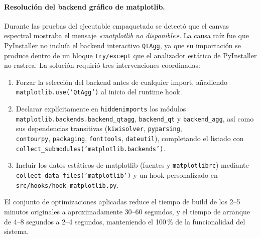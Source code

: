 \paragraph{Resolución del backend gráfico de matplotlib.}
Durante las pruebas del ejecutable empaquetado se detectó que el canvas
espectral mostraba el mensaje \textit{«matplotlib no disponible»}. La causa
raíz fue que PyInstaller no incluía el backend interactivo \texttt{QtAgg},
ya que su importación se produce dentro de un bloque \texttt{try/except} que
el analizador estático de PyInstaller no rastrea. La solución requirió tres
intervenciones coordinadas:

\begin{enumerate}
    \item Forzar la selección del backend antes de cualquier import,
    añadiendo\\ \texttt{matplotlib.use('QtAgg')} al inicio del runtime hook.
    \item Declarar explícitamente en \texttt{hiddenimports} los módulos \\
    \texttt{matplotlib.backends.backend\_qtagg}, \texttt{backend\_qt} y
    \texttt{backend\_agg}, así como sus dependencias transitivas
    (\texttt{kiwisolver}, \texttt{pyparsing},\\ \texttt{contourpy},
    \texttt{packaging}, \texttt{fonttools}, \texttt{dateutil}), completando
    el listado con \texttt{collect\_submodules('matplotlib.backends')}.
    \item Incluir los datos estáticos de matplotlib (fuentes y
    \texttt{matplotlibrc}) mediante \texttt{collect\_data\_files('matplotlib')}
    y un hook personalizado en \texttt{src/hooks/hook-matplotlib.py}.
\end{enumerate}

El conjunto de optimizaciones aplicadas reduce el tiempo de build de los
2--5 minutos originales a aproximadamente 30--60 segundos, y el tiempo de
arranque de 4--8 segundos a 2--4 segundos, manteniendo el 100\,\% de la
funcionalidad del sistema.
